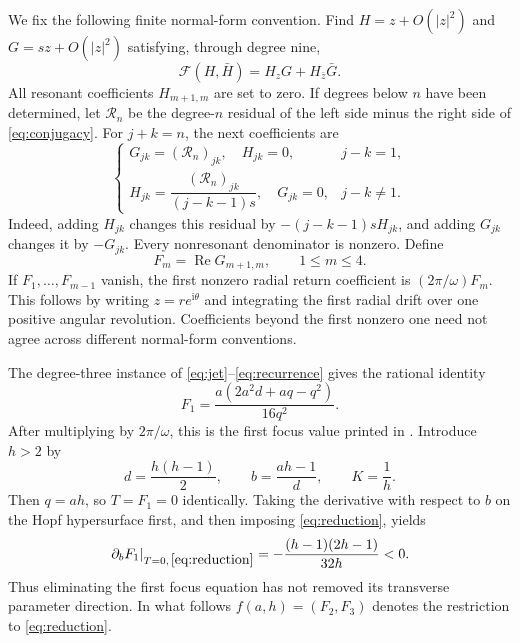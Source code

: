 \documentclass[11pt,a4paper]{article}
\theoremstyle{remark}
\newcommand{\ii}{\mathrm i}
\newcommand{\Rea}{\operatorname{Re}}
\numberwithin{equation}{section}
\begin{document}
We fix the following finite normal-form convention. Find $H=z+O(|z|^2)$
and $G=sz+O(|z|^2)$ satisfying, through degree nine,
\begin{equation}\label{eq:conjugacy}
 \mathcal F(H,\bar H)=H_zG+H_{\bar z}\bar G.
\end{equation}
All resonant coefficients $H_{m+1,m}$ are set to zero. If degrees below
$n$ have been determined, let $\mathcal R_n$ be the degree-$n$ residual
of the left side minus the right side of \eqref{eq:conjugacy}. For
$j+k=n$, the next coefficients are
\begin{equation}\label{eq:recurrence}
 \begin{cases}
 G_{jk}=(\mathcal R_n)_{jk},\quad H_{jk}=0,&j-k=1,\\[2pt]
 H_{jk}=\dfrac{(\mathcal R_n)_{jk}}{(j-k-1)s},\quad G_{jk}=0,&j-k\ne1.
 \end{cases}
\end{equation}
Indeed, adding $H_{jk}$ changes this residual by
$-(j-k-1)sH_{jk}$, and adding $G_{jk}$ changes it by $-G_{jk}$.
Every nonresonant denominator is nonzero. Define
\begin{equation}\label{eq:focus}
 F_m=\Rea G_{m+1,m},\qquad 1\leq m\leq4.
\end{equation}
If $F_1,\ldots,F_{m-1}$ vanish, the first nonzero radial return
coefficient is $(2\pi/\omega)F_m$. This follows by writing
$z=r e^{\ii\theta}$ and integrating the first radial drift over one
positive angular revolution. Coefficients beyond the first nonzero one
need not agree across different normal-form conventions.

The degree-three instance of \eqref{eq:jet}--\eqref{eq:recurrence} gives
the rational identity
\begin{equation}\label{eq:F1}
 F_1=\frac{a(2a^2d+aq-q^2)}{16q^2}.
\end{equation}
After multiplying by $2\pi/\omega$, this is the first focus value
printed in \cite[Section~5.1]{BorosHofbauer2024}. Introduce $h>2$ by
\begin{equation}\label{eq:reduction}
 d=\frac{h(h-1)}2,\qquad b=\frac{ah-1}{d},\qquad K=\frac1h.
\end{equation}
Then $q=ah$, so $T=F_1=0$ identically. Taking the derivative with respect
to $b$ on the Hopf hypersurface first, and then imposing
\eqref{eq:reduction}, yields
\begin{equation}\label{eq:bderivative}
 \left.\partial_bF_1\right|_{T=0,\,\eqref{eq:reduction}}
       =-\frac{(h-1)(2h-1)}{32h}<0.
\end{equation}
Thus eliminating the first focus equation has not removed its transverse
parameter direction. In what follows $f(a,h)=(F_2,F_3)$ denotes the
restriction to \eqref{eq:reduction}.
\end{document}
